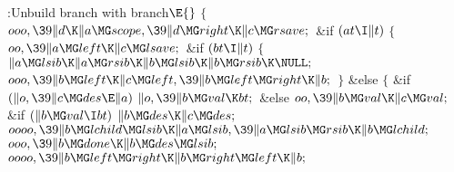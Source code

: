 \Y\B\4:Unbuild branch with branch\X${}\E{}$\6
${}\{{}$\1\6
${}\\{ooo},\39\|d\K\|a\MG\\{scope},\39\|d\MG\\{right}\K\|c\MG\\{rsave};{}$\6
\&{if} ${}(\\{at}\I\|t){}$\5
${}\{{}$\1\6
${}\\{oo},\39\|a\MG\\{left}\K\|c\MG\\{lsave};{}$\6
\&{if} ${}(\\{bt}\I\|t){}$\5
${}\{{}$\1\6
${}\|a\MG\\{lsib}\K\|a\MG\\{rsib}\K\|b\MG\\{lsib}\K\|b\MG\\{rsib}\K\NULL;{}$\6
${}\\{ooo},\39\|b\MG\\{left}\K\|c\MG\\{left},\39\|b\MG\\{left}\MG\\{right}\K%
\|b;{}$\6
\4${}\}{}$\5
\2\&{else}\5
${}\{{}$\1\6
\&{if} ${}(\|o,\39\|c\MG\\{des}\E\|a){}$\1\5
${}\|o,\39\|b\MG\\{val}\K\\{bt};{}$\2\6
\&{else}\1\5
${}\\{oo},\39\|b\MG\\{val}\K\|c\MG\\{val};{}$\2\6
\&{if} ${}(\|b\MG\\{val}\I\\{bt}){}$\1\5
${}\|b\MG\\{des}\K\|c\MG\\{des};{}$\2\6
${}\\{oooo},\39\|b\MG\\{lchild}\MG\\{lsib}\K\|a\MG\\{lsib},\39\|a\MG\\{lsib}\MG%
\\{rsib}\K\|b\MG\\{lchild};{}$\6
${}\\{ooo},\39\|b\MG\\{done}\K\|b\MG\\{des}\MG\\{lsib};{}$\6
${}\\{oooo},\39\|b\MG\\{left}\MG\\{right}\K\|b\MG\\{right}\MG\\{left}\K\|b;{}$\6

